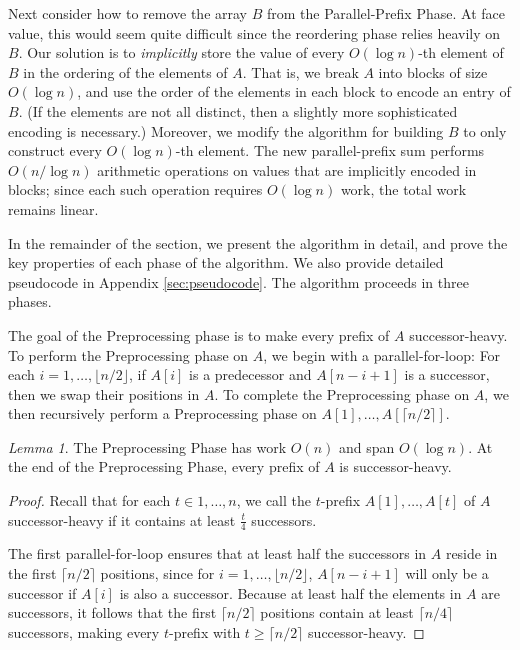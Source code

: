 \documentclass[sigplan, 10pt, nonacm]{acmart}
\renewcommand{\paragraph}[1]{\vspace{0.09in}\noindent{\bf \boldmath #1.}}
\theoremstyle{remark}
\newtheorem{lemma}[thm]{Lemma}
\theoremstyle{remark}
\begin{document}
\begin{appendices}
Next consider how to remove the array $B$ from the Parallel-Prefix
Phase. At face value, this would seem quite difficult since the
reordering phase relies heavily on $B$. Our solution is to
\emph{implicitly} store the value of every $O(\log n)$-th element of
$B$ in the ordering of the elements of $A$. That is, we break $A$ into
blocks of size $O(\log n)$, and use the order of the elements in each
block to encode an entry of $B$. (If the elements are not all
  distinct, then a slightly more sophisticated encoding is necessary.)
Moreover, we modify the algorithm for building $B$ to only construct
every $O(\log n)$-th element. The new parallel-prefix sum performs
$O(n / \log n)$ arithmetic operations on values that are implicitly
encoded in blocks; since each such operation requires $O(\log n)$
work, the total work remains linear.

In the remainder of the section, we present the algorithm in detail,
and prove the key properties of each phase of the algorithm. We also
provide detailed pseudocode in Appendix \ref{sec:pseudocode}.  The
algorithm proceeds in three phases.

\paragraph{A Preprocessing Phase}
The goal of the Preprocessing phase is to make every prefix of $A$
successor-heavy. To perform the Preprocessing phase on $A$, we begin
with a parallel-for-loop: For each $i = 1, \ldots, \lfloor n /
2\rfloor$, if $A[i]$ is a predecessor and $A[n - i + 1]$ is a
successor, then we swap their positions in $A$. To complete the
Preprocessing phase on $A$, we then recursively perform a
Preprocessing phase on $A[1], \ldots, A[\lceil n / 2 \rceil]$.

\begin{lemma}
 The Preprocessing Phase has work $O(n)$ and span $O(\log n)$. At the
 end of the Preprocessing Phase, every prefix of $A$ is
 successor-heavy.
  \label{lem:preprocessingphase}
\end{lemma}
\begin{proof}
Recall that for each $t \in 1, \ldots, n$, we call the $t$-prefix
$A[1], \ldots, A[t]$ of $A$ successor-heavy if it contains at least
$\frac{t}{4}$ successors.

The first parallel-for-loop ensures that at least half the successors
in $A$ reside in the first $\lceil n / 2 \rceil$ positions, since for
$i = 1, \ldots, \lfloor n / 2 \rfloor$, $A[n - i + 1]$ will only be a
successor if $A[i]$ is also a successor. Because at least half the
elements in $A$ are successors, it follows that the first $\lceil n /
2 \rceil$ positions contain at least $\lceil n / 4\rceil$ successors,
making every $t$-prefix with $t \ge \lceil n / 2 \rceil$
successor-heavy.


\end{proof}
\end{appendices}
\end{document}
